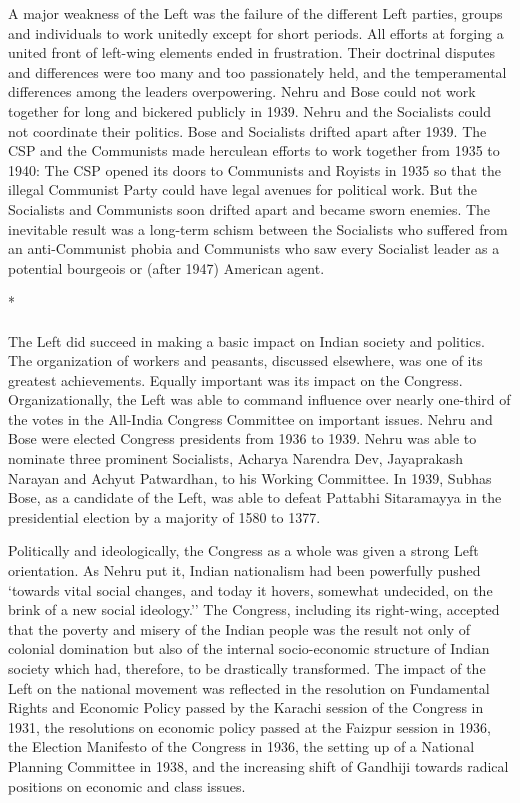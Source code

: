 A major weakness of the Left was the failure of the different Left parties, groups and individuals to work unitedly except for short periods. All efforts at forging a united front of left-wing elements ended in frustration. Their doctrinal disputes and differences were too many and too passionately held, and the temperamental differences among the leaders overpowering. Nehru and Bose could not work together for long and bickered publicly in 1939. Nehru and the Socialists could not coordinate their politics. Bose and Socialists drifted apart after 1939. The CSP and the Communists made herculean efforts to work together from 1935 to 1940: The CSP opened its doors to Communists and Royists in 1935 so that the illegal Communist Party could have legal avenues for political work. But the Socialists and Communists soon drifted apart and became sworn enemies. The inevitable result was a long-term schism between the Socialists who suffered from an anti-Communist phobia and Communists who saw every Socialist leader as a potential bourgeois or (after 1947) American agent.

\begin{center}*\end{center}

\paragraph*{}


The Left did succeed in making a basic impact on Indian society and politics. The organization of workers and peasants, discussed elsewhere, was one of its greatest achievements. Equally important was its impact on the Congress. Organizationally, the Left was able to command influence over nearly one-third of the votes in the All-India Congress Committee on important issues. Nehru and Bose were elected Congress presidents from 1936 to 1939. Nehru was able to nominate three prominent Socialists, Acharya Narendra Dev, Jayaprakash Narayan and Achyut Patwardhan, to his Working Committee. In 1939, Subhas Bose, as a candidate of the Left, was able to defeat Pattabhi Sitaramayya in the presidential election by a majority of 1580 to 1377. 

Politically and ideologically, the Congress as a whole was given a strong Left orientation. As Nehru put it, Indian nationalism had been powerfully pushed `towards vital social changes, and today it hovers, somewhat undecided, on the brink of a new social ideology.'' The Congress, including its right-wing, accepted that the poverty and misery of the Indian people was the result not only of colonial domination but also of the internal socio-economic structure of Indian society which had, therefore, to be drastically transformed. The impact of the Left on the national movement was reflected in the resolution on Fundamental Rights and Economic Policy passed by the Karachi session of the Congress in 1931, the resolutions on economic policy passed at the Faizpur session in 1936, the Election Manifesto of the Congress in 1936, the setting up of a National Planning Committee in 1938, and the increasing shift of Gandhiji towards radical positions on economic and class issues.


